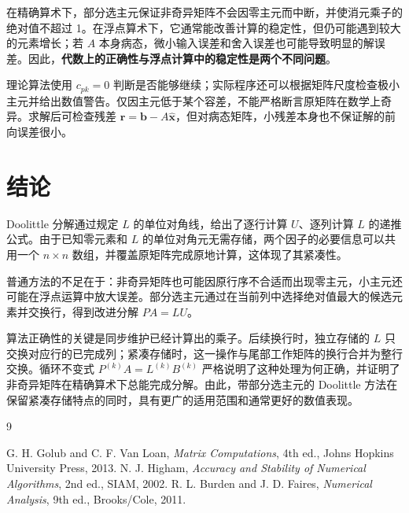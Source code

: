 \documentclass[UTF8,11pt,a4paper,fontset=fandol]{ctexart}
\begin{document}
在精确算术下，部分选主元保证非奇异矩阵不会因零主元而中断，并使消元乘子的绝对值不超过 1。在浮点算术下，它通常能改善计算的稳定性，但仍可能遇到较大的元素增长；若 $A$ 本身病态，微小输入误差和舍入误差也可能导致明显的解误差。因此，\textbf{代数上的正确性与浮点计算中的稳定性是两个不同问题}。

理论算法使用 $c_{pk}=0$ 判断是否能够继续；实际程序还可以根据矩阵尺度检查极小主元并给出数值警告。仅因主元低于某个容差，不能严格断言原矩阵在数学上奇异。求解后可检查残差 $\mathbf r=\mathbf b-A\widehat{\mathbf x}$，但对病态矩阵，小残差本身也不保证解的前向误差很小。

\section{结论}
Doolittle 分解通过规定 $L$ 的单位对角线，给出了逐行计算 $U$、逐列计算 $L$ 的递推公式。由于已知零元素和 $L$ 的单位对角元无需存储，两个因子的必要信息可以共用一个 $n\times n$ 数组，并覆盖原矩阵完成原地计算，这体现了其紧凑性。

普通方法的不足在于：非奇异矩阵也可能因原行序不合适而出现零主元，小主元还可能在浮点运算中放大误差。部分选主元通过在当前列中选择绝对值最大的候选元素并交换行，得到改进分解 $PA=LU$。

算法正确性的关键是同步维护已经计算出的乘子。后续换行时，独立存储的 $L$ 只交换对应行的已完成列；紧凑存储时，这一操作与尾部工作矩阵的换行合并为整行交换。循环不变式 $P^{(k)}A=L^{(k)}B^{(k)}$ 严格说明了这种处理为何正确，并证明了非奇异矩阵在精确算术下总能完成分解。由此，带部分选主元的 Doolittle 方法在保留紧凑存储特点的同时，具有更广的适用范围和通常更好的数值表现。

\begin{thebibliography}{9}
 G. H. Golub and C. F. Van Loan, \textit{Matrix Computations}, 4th ed., Johns Hopkins University Press, 2013.
 N. J. Higham, \textit{Accuracy and Stability of Numerical Algorithms}, 2nd ed., SIAM, 2002.
 R. L. Burden and J. D. Faires, \textit{Numerical Analysis}, 9th ed., Brooks/Cole, 2011.
\end{thebibliography}
\end{document}
